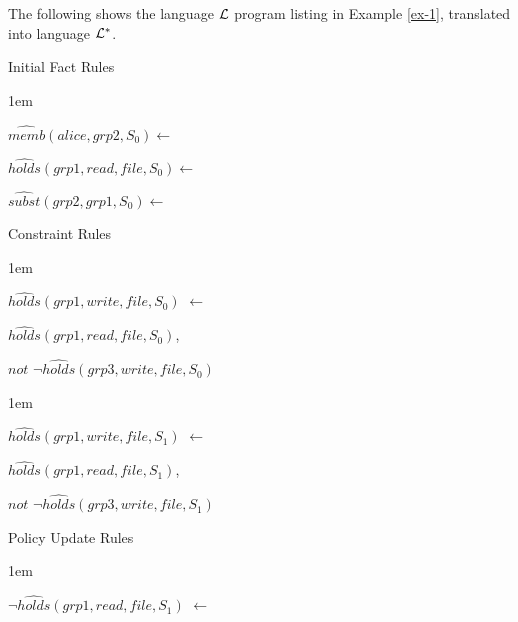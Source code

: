 \documentclass[global,twocolumn,final]{svjour}
\newenvironment{vexample}
  {\begin{example}\hspace{0.25em}}
  {\end{example}}
\newenvironment{vquote}
  {\begin{list}{}{\leftmargin 1em}\item[]}
  {\end{list}}
\begin{document}
        \begin{vexample}
          \label{ex-2}
          The following shows the language ${\cal L}$ program listing in
          Example \ref{ex-1},  translated into language ${\cal L}^{*}$.

          \begin{enumerate}
            \item
              Initial Fact Rules

              \begin{vquote}
                $\hat{memb}(alice, grp2, S_{0}) \leftarrow$

                $\hat{holds}(grp1, read, file,S_{0}) \leftarrow$

                $\hat{subst}(grp2, grp1, S_{0}) \leftarrow$
              \end{vquote}

            \item
              Constraint Rules

              \begin{vquote}
                $\hat{holds}(grp1, write, file, S_{0})$ $\leftarrow$

                \hspace{1em}
                $\hat{holds}(grp1, read, file, S_{0})$,

                \hspace{1em}
                $not$ $\lnot\hat{holds}(grp3, write, file, S_{0})$
              \end{vquote}

              \begin{vquote}
                $\hat{holds}(grp1, write, file, S_{1})$ $\leftarrow$

                \hspace{1em}
                $\hat{holds}(grp1, read, file, S_{1})$,

                \hspace{1em}
                $not$ $\lnot\hat{holds}(grp3, write, file, S_{1})$
              \end{vquote}

            \item
              Policy Update Rules

              \begin{vquote}
                $\lnot\hat{holds}(grp1, read, file, S_{1})$ $\leftarrow$
              \end{vquote}


\end{enumerate}
\end{vexample}
\end{document}
